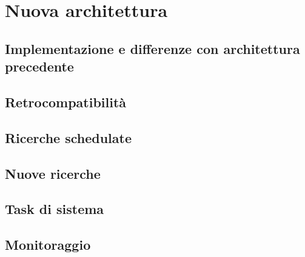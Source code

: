 \chapter{Nuova architettura}
\label{cha:nuova_architettura}

\section{Implementazione e differenze con architettura precedente}
\label{sec:implementazione_differenze}

\lipsum[1]

\section{Retrocompatibilità}
\label{sec:retrocompatibility}

\lipsum[1]

\section{Ricerche schedulate}
\label{sec:schedulate}

\lipsum[1]

\section{Nuove ricerche}
\label{sec:nuove}

\lipsum[1]

\section{Task di sistema}
\label{sec:sistema}

\lipsum[1]

\section{Monitoraggio}
\label{sec:monitoraggio}

\lipsum[1]
